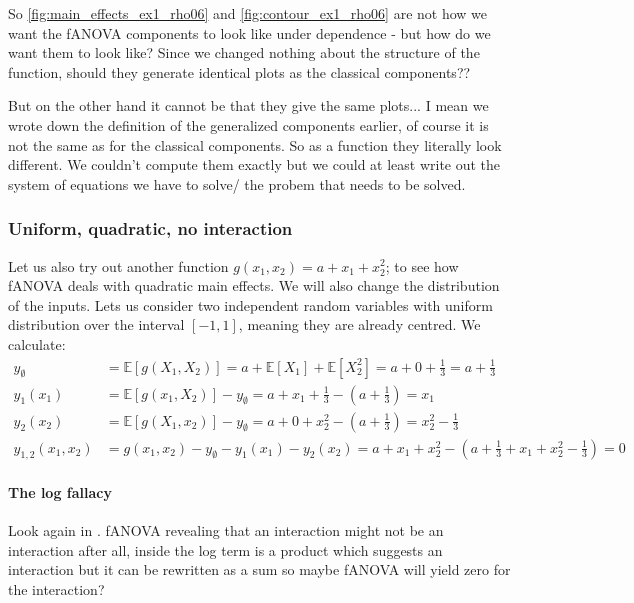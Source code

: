 So \autoref{fig:main_effects_ex1_rho06} and \autoref{fig:contour_ex1_rho06} are not how we want the fANOVA components to look like under dependence - but how do we want them to look like?
Since we changed nothing about the structure of the function, should they generate identical plots as the classical components??

But on the other hand it cannot be that they give the same plots... I mean we wrote down the definition of the generalized components earlier, of course it is not the same as for the classical components. So as a function they literally look different. We couldn't compute them exactly but we could at least write out the system of equations we have to solve/ the probem that needs to be solved.

\subsubsection*{Uniform, quadratic, no interaction}
Let us also try out another function $g(x_1, x_2) = a + x_1 + x_2^2$; to see how fANOVA deals with quadratic main effects. 
We will also change the distribution of the inputs. Lets us consider two independent random variables with uniform distribution over the interval \([-1, 1]\), meaning they are already centred. We calculate:
\begin{align*}
y_\emptyset &= \mathbb{E}[g(X_1, X_2)] = a + \mathbb{E}[X_1] + \mathbb{E}[X_2^2] = a + 0 + \tfrac{1}{3} = a + \tfrac{1}{3} \\
y_1(x_1) &= \mathbb{E}[g(x_1, X_2)] - y_\emptyset = a + x_1 + \tfrac{1}{3} - \left(a + \tfrac{1}{3}\right) = x_1 \\
y_2(x_2) &= \mathbb{E}[g(X_1, x_2)] - y_\emptyset = a + 0 + x_2^2 - \left(a + \tfrac{1}{3}\right) = x_2^2 - \tfrac{1}{3} \\
y_{1,2}(x_1, x_2) &= g(x_1, x_2) - y_\emptyset - y_1(x_1) - y_2(x_2) = a + x_1 + x_2^2 - \left(a + \tfrac{1}{3} + x_1 + x_2^2 - \tfrac{1}{3}\right) = 0
\end{align*}

\paragraph{The log fallacy}
Look again in \cite{lengerich2020}. fANOVA revealing that an interaction might not be an interaction after all, inside the log term is a product which suggests an interaction but it can be rewritten as a sum so maybe fANOVA will yield zero for the interaction?




